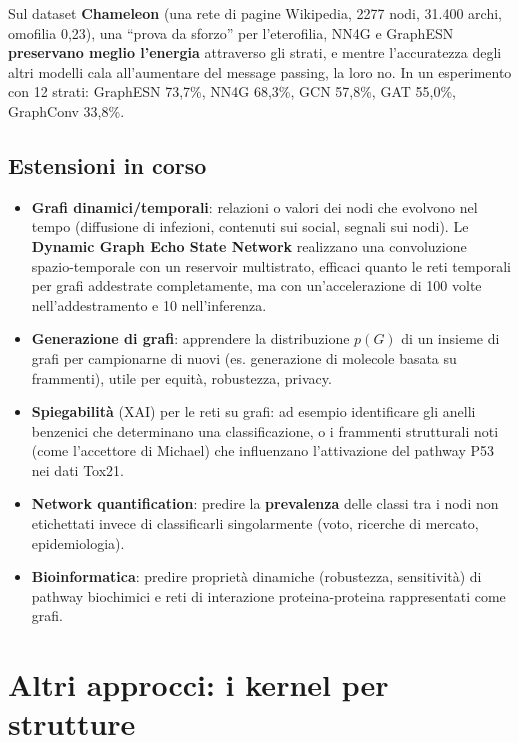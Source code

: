 Sul dataset \textbf{Chameleon} (una rete di pagine Wikipedia, 2277 nodi,
31.400 archi, omofilia 0,23), una ``prova da sforzo'' per l'eterofilia,
NN4G e GraphESN \textbf{preservano meglio l'energia} attraverso gli
strati, e mentre l'accuratezza degli altri modelli cala all'aumentare
del message passing, la loro no. In un esperimento con 12 strati:
GraphESN 73,7\%, NN4G 68,3\%, GCN 57,8\%, GAT 55,0\%, GraphConv 33,8\%.

\subsection{Estensioni in corso}\label{estensioni-in-corso}

\begin{itemize}
\tightlist
\item
  \textbf{Grafi dinamici/temporali}: relazioni o valori dei nodi che
  evolvono nel tempo (diffusione di infezioni, contenuti sui social,
  segnali sui nodi). Le \textbf{Dynamic Graph Echo State Network}
  realizzano una convoluzione spazio-temporale con un reservoir
  multistrato, efficaci quanto le reti temporali per grafi addestrate
  completamente, ma con un'accelerazione di 100 volte nell'addestramento
  e 10 nell'inferenza.
\item
  \textbf{Generazione di grafi}: apprendere la distribuzione \(p(G)\) di
  un insieme di grafi per campionarne di nuovi (es. generazione di
  molecole basata su frammenti), utile per equità, robustezza, privacy.
\item
  \textbf{Spiegabilità} (XAI) per le reti su grafi: ad esempio
  identificare gli anelli benzenici che determinano una classificazione,
  o i frammenti strutturali noti (come l'accettore di Michael) che
  influenzano l'attivazione del pathway P53 nei dati Tox21.
\item
  \textbf{Network quantification}: predire la \textbf{prevalenza} delle
  classi tra i nodi non etichettati invece di classificarli
  singolarmente (voto, ricerche di mercato, epidemiologia).
\item
  \textbf{Bioinformatica}: predire proprietà dinamiche (robustezza,
  sensitività) di pathway biochimici e reti di interazione
  proteina-proteina rappresentati come grafi.
\end{itemize}

\section{Altri approcci: i kernel per
strutture}\label{altri-approcci-i-kernel-per-strutture}


